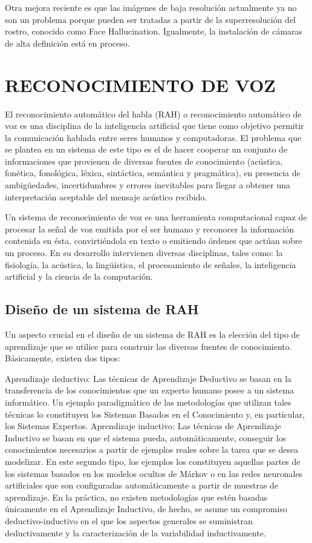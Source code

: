 \documentclass[a4paper,11pt]{article}
\begin{document}
  Otra mejora reciente es que las imágenes de baja resolución actualmente ya no son un problema porque pueden ser tratadas a partir de la superresolución del rostro, conocido como Face Hallucination. Igualmente, la instalación de cámaras de alta definición está en proceso.
 \section{RECONOCIMIENTO DE VOZ}
 El reconocimiento automático del habla (RAH) o reconocimiento automático de voz es una disciplina de la inteligencia artificial que tiene como objetivo permitir la comunicación hablada entre seres humanos y computadoras. El problema que se plantea en un sistema de este tipo es el de hacer cooperar un conjunto de informaciones que provienen de diversas fuentes de conocimiento (acústica, fonética, fonológica, léxica, sintáctica, semántica y pragmática), en presencia de ambigüedades, incertidumbres y errores inevitables para llegar a obtener una interpretación aceptable del mensaje acústico recibido.
 
 Un sistema de reconocimiento de voz es una herramienta computacional capaz de procesar la señal de voz emitida por el ser humano y reconocer la información contenida en ésta, convirtiéndola en texto o emitiendo órdenes que actúan sobre un proceso. En su desarrollo intervienen diversas disciplinas, tales como: la fisiología, la acústica, la lingüística, el procesamiento de señales, la inteligencia artificial y la ciencia de la computación.
 
 \subsection{Diseño de un sistema de RAH}
 Un aspecto crucial en el diseño de un sistema de RAH es la elección del tipo de aprendizaje que se utilice para construir las diversas fuentes de conocimiento. Básicamente, existen dos tipos:
 
 Aprendizaje deductivo: Las técnicas de Aprendizaje Deductivo se basan en la transferencia de los conocimientos que un experto humano posee a un sistema informático. Un ejemplo paradigmático de las metodologías que utilizan tales técnicas lo constituyen los Sistemas Basados en el Conocimiento y, en particular, los Sistemas Expertos.
 Aprendizaje inductivo: Las técnicas de Aprendizaje Inductivo se basan en que el sistema pueda, automáticamente, conseguir los conocimientos necesarios a partir de ejemplos reales sobre la tarea que se desea modelizar. En este segundo tipo, los ejemplos los constituyen aquellas partes de los sistemas basados en los modelos ocultos de Márkov o en las redes neuronales artificiales que son configuradas automáticamente a partir de muestras de aprendizaje.
 En la práctica, no existen metodologías que estén basadas únicamente en el Aprendizaje Inductivo, de hecho, se asume un compromiso deductivo-inductivo en el que los aspectos generales se suministran deductivamente y la caracterización de la variabilidad inductivamente.
 
\end{document}
